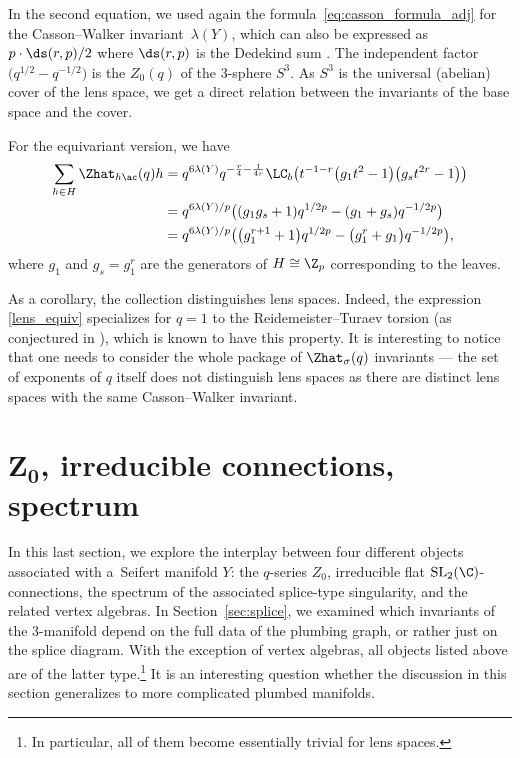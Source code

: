\documentclass[pdftex]{sigma}
\begin{document}
In the second equation, we used again the formula~\eqref{eq:casson_formula_adj} for the Casson--Walker invariant~$\lambda(Y)$, which can also be expressed as $p \cdot \ds(r,p)/2$ where $\ds(r,p)$ is the Dedekind sum \cite[Example~9.3.6]{Nem22}. The independent factor $\bigl(q^{1/2}-q^{-1/2}\bigr)$ is the $Z_0(q)$ of the 3-sphere $S^3$. As $S^3$ is the universal (abelian) cover of the lens space, we get a direct relation between the invariants of the base space and the cover.

For the equivariant version, we have
\begin{align}
	\sum_{h \in H} \Zhat_{h \ac}(q)h & = q^{6\lambda(Y)}q^{-\frac{r}{4}-\frac{1}{4r}} \LC_b \bigl(t^{-1-r}\bigl(g_1 t^2-1\bigr)\bigl(g_s t^{2r}-1\bigr)\bigr)\nonumber\\
	 & = q^{6\lambda(Y)/p} \bigl((g_1g_s+1) q^{1/2p} - (g_1+g_s) q^{-1/2p}\bigr)\nonumber\\
				& = q^{6\lambda(Y)/p} \bigl(\bigl(g_1^{r+1}+1\bigr) q^{1/2p} - \bigl(g_1^{r}+g_1\bigr) q^{-1/2p}\bigr),\label{lens_equiv}
\end{align}
where $g_1$ and $g_s=g_1^r$ are the generators of $H \cong \Z_p$ corresponding to the leaves.

As a corollary, the collection  distinguishes lens spaces. Indeed, the expression \ref{lens_equiv} specializes for $q=1$ to the Reidemeister--Turaev torsion (as conjectured in \cite{CGPS20}), which is known to have this property. It is interesting to notice that one needs to consider the whole package of $\Zhat_\sigma(q)$ invariants --- the set of exponents of $q$ itself does not distinguish lens spaces as there are distinct lens spaces with the same Casson--Walker invariant.

\section[Z\_0, irreducible connections, spectrum]{$\boldsymbol{Z_0}$, irreducible connections, spectrum}\label{sec:spectrum}

In this last section, we explore the interplay between four different objects associated with a~Seifert manifold $Y$: the $q$-series $Z_0$, irreducible flat $\operatorname{SL}_2(\C)$-connections, the spectrum of the associated splice-type singularity, and the related vertex algebras. In Section~\ref{sec:splice}, we examined which invariants of the 3-manifold depend on the full data of the plumbing graph, or rather just on the splice diagram. With the exception of vertex algebras, all objects listed above are of the latter type.\footnote{In particular, all of them become essentially trivial for lens spaces.} It is an interesting question whether the discussion in this section generalizes to more complicated plumbed manifolds.
\end{document}
